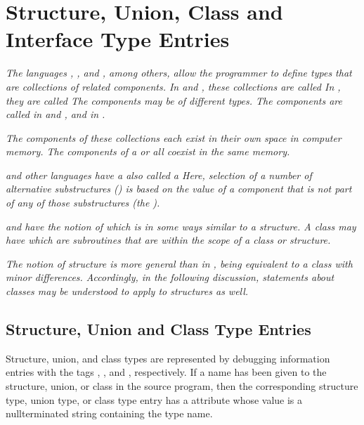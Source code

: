 {
\section{Structure, Union, Class and Interface Type Entries}
\label{chap:structureunionclassandinterfacetypeentries}

\textit{The languages 
, 
, and 
, among others, allow the
programmer to define types that are collections of related
components. 
In  and , these collections are called
In , they are called 
The components may be of different types. The components are
called  in  and 
, and  in .}

\textit{The components of these collections each exist in their
own space in computer memory. The components of a  or 
 all coexist in the same memory.}

\textit{ and 
other languages have a 
also called a  Here, selection of a
number of alternative substructures () is based
on the value of a component that is not part of any of those
substructures (the ).}

\textit{ and 
 have the notion of  which is in some
ways similar to a structure. A class may have  which are subroutines that are within the scope
of a class or structure.}

\textit{The  notion of 
structure is more general than in , being
equivalent to a class with minor differences. Accordingly,
in the following discussion, statements about 
 classes may
be understood to apply to  structures as well.}

\subsection{Structure, Union and Class Type Entries}
\label{chap:structureunionandclasstypeentries}
Structure, union, and class types are represented by debugging
information entries 
with 
the tags 
\DWTAGstructuretypeTARG,
\DWTAGuniontypeTARG, 
and \DWTAGclasstypeTARG,
respectively. If a name has been given to the structure,
union, or class in the source program, then the corresponding
structure type, union type, or class type entry has a
\DWATname{} attribute 
whose value is a null\dash terminated string
containing the type name.

}
